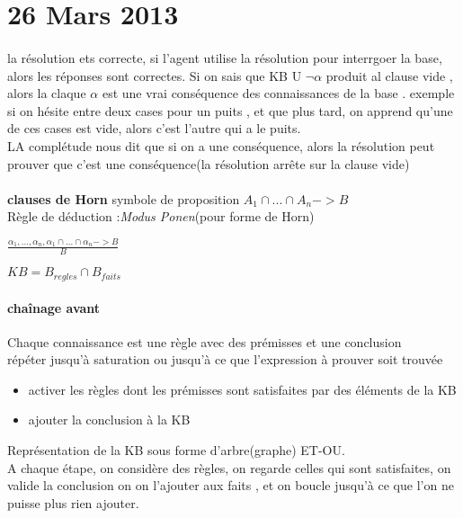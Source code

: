 \documentclass{article}
\begin{document}
\section{26 Mars 2013} 
\paragraph{} la résolution ets correcte, si l'agent utilise la résolution pour interrgoer la base, alors les réponses sont correctes. Si on sais que  KB U $\neg\alpha$ produit al clause vide , alors la claque $\alpha$ est une vrai conséquence des connaissances de la base . exemple si on hésite entre deux cases pour un puits , et que plus tard, on apprend qu'une de ces cases est vide, alors c’est l'autre qui a le puits.\\ LA complétude nous dit que si on a une conséquence, alors la résolution peut prouver que c'est une conséquence(la résolution arrête sur la clause vide) \\\\
\textbf{clauses de Horn} symbole de proposition $A_1 \cap ...\cap A_n -> B$\\
Règle de déduction :\textit{Modus Ponen}(pour forme de Horn)
\begin{center}
$\frac{\alpha_1,...,\alpha_n,\alpha_1 \cap ...\cap \alpha_n -> B}{B}$
\end{center}

$KB = B_{regles} \cap B_{faits}$\\
\paragraph{chaînage avant} Chaque connaissance est une règle avec des prémisses et une conclusion\\répéter jusqu’à saturation ou jusqu’à ce que l'expression à prouver soit trouvée
\begin{itemize}
\item activer les règles dont les prémisses sont satisfaites par des éléments de la KB
\item ajouter la conclusion à la KB
\end{itemize} 
Représentation de la KB sous forme d'arbre(graphe) ET-OU.\\
A chaque étape, on considère des règles, on regarde celles qui sont satisfaites, on valide la conclusion on on l'ajouter aux faits , et on boucle jusqu'à ce que l'on ne puisse plus rien ajouter.
\end{document}
